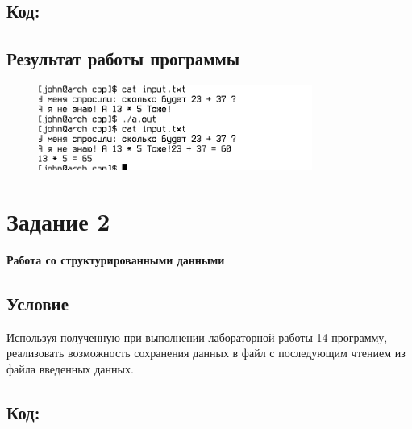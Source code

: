 \documentclass[14pt,a4paper]{article}
\begin{document}
\subsection{Код:}


\subsection{Результат работы программы}
\begin{figure}[h]
    \centering
    \includegraphics[width=0.8\textwidth]{data/demo15_1.png} %
\end{figure}

\section*{Задание 2}
\textbf{Работа со структурированными данными}
\setcounter{subsection}{0}
\subsection{Условие}
Используя полученную при выполнении лабораторной работы 14 программу, реализовать возможность сохранения данных в файл с последующим чтением из файла введенных данных.
\subsection{Код:}

\end{document}
